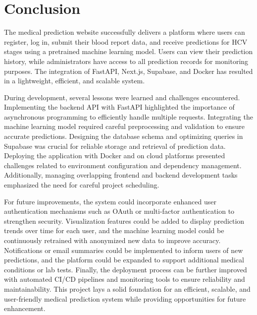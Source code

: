 \section{Conclusion}
The medical prediction website successfully delivers a platform where users can register,
log in, submit their blood report data, and receive predictions for HCV stages
using a pretrained machine learning model. Users can view their prediction
history, while administrators have access to all prediction records
for monitoring purposes. The integration of FastAPI, Next.js, Supabase,
and Docker has resulted in a lightweight, efficient, and scalable system.

During development, several lessons were learned and challenges encountered.
Implementing the backend API with FastAPI highlighted the importance of asynchronous programming
to efficiently handle multiple requests. Integrating the machine learning model
required careful preprocessing and validation to ensure accurate predictions.
Designing the database schema and optimizing queries in Supabase was crucial for reliable 
storage and retrieval of prediction data. Deploying the application with Docker
and on cloud platforms presented challenges related to environment configuration and dependency management.
Additionally, managing overlapping frontend and backend development tasks emphasized the need for careful project scheduling.

For future improvements, the system could incorporate enhanced user authentication 
mechanisms such as OAuth or multi-factor authentication
to strengthen security. Visualization features could be added
to display prediction trends over time for each user, and
the machine learning model could be continuously retrained with anonymized
new data to improve accuracy. Notifications or email summaries could be
implemented to inform users of new predictions, and the platform could
be expanded to support additional medical conditions or lab tests.
Finally, the deployment process can be further improved with automated
CI/CD pipelines and monitoring tools to ensure reliability and maintainability.
This project lays a solid foundation for an efficient, scalable, and user-friendly
medical prediction system while providing opportunities for future enhancement.
